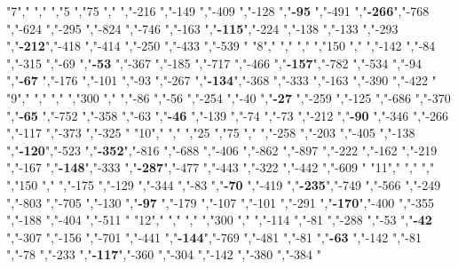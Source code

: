 "7","        ","     ","5   ","75  ","     ","-216          ","-149          ","-409          ","-128          ","\textbf{-95} ","-491          ","\textbf{-266}","-768          ","-624          ","-295          ","-824          ","-746          ","-163          ","\textbf{-115}","-224          ","-138          ","-133          ","-293          ","\textbf{-212}","-418          ","-414          ","-250          ","-433          ","-539          "
"8","        ","     ","    ","150 ","     ","-142          ","-84           ","-315          ","-69           ","\textbf{-53} ","-367          ","-185          ","-717          ","-466          ","\textbf{-157}","-782          ","-534          ","-94           ","\textbf{-67} ","-176          ","-101          ","-93           ","-267          ","\textbf{-134}","-368          ","-333          ","-163          ","-390          ","-422          "
"9","        ","     ","    ","300 ","     ","-86           ","-56           ","-254          ","-40           ","\textbf{-27} ","-259          ","-125          ","-686          ","-370          ","\textbf{-65} ","-752          ","-358          ","-63           ","\textbf{-46} ","-139          ","-74           ","-73           ","-212          ","\textbf{-90} ","-346          ","-266          ","-117          ","-373          ","-325          "
"10","        ","     ","25  ","75  ","     ","-258          ","-203          ","-405          ","-138          ","\textbf{-120}","-523          ","\textbf{-352}","-816          ","-688          ","-406          ","-862          ","-897          ","-222          ","-162          ","-219          ","-167          ","\textbf{-148}","-333          ","\textbf{-287}","-477          ","-443          ","-322          ","-442          ","-609          "
"11","        ","     ","    ","150 ","     ","-175          ","-129          ","-344          ","-83           ","\textbf{-70} ","-419          ","\textbf{-235}","-749          ","-566          ","-249          ","-803          ","-705          ","-130          ","\textbf{-97} ","-179          ","-107          ","-101          ","-291          ","\textbf{-170}","-400          ","-355          ","-188          ","-404          ","-511          "
"12","        ","     ","    ","300 ","     ","-114          ","-81           ","-288          ","-53           ","\textbf{-42} ","-307          ","-156          ","-701          ","-441          ","\textbf{-144}","-769          ","-481          ","-81           ","\textbf{-63} ","-142          ","-81           ","-78           ","-233          ","\textbf{-117}","-360          ","-304          ","-142          ","-380          ","-384          "
